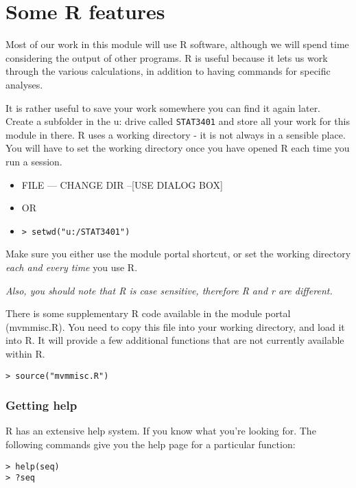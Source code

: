 \chapter{Some R features}

Most of our work in this module will use R software, although we will spend time considering the output of other programs.   R is useful because it lets us work through the various calculations, in addition to having commands for specific analyses.

It is rather useful to save your work somewhere you can find it again later.   Create a subfolder in the u: drive called \texttt{STAT3401} and store all your work for this module in there.   R uses a working directory - it is not always in a sensible place.   You will have to set the working directory once you have opened R each time you run a session.   

\begin{itemize}
\item[] FILE --- CHANGE DIR --[USE DIALOG BOX]
\item[] OR
\item[] \texttt{> setwd("u:/STAT3401")}
\end{itemize}

Make sure you either use the module portal shortcut, or set the working directory \emph{each and every time} you use R.

\emph{Also, you should note that R is case sensitive, therefore R and r are different.}

There is some supplementary R code available in the module portal (mvmmisc.R).   You need to copy this file into your working directory, and load it into R.   It will provide a few additional functions that are not currently available within R.

\begin{verbatim}
> source("mvmmisc.R")
\end{verbatim}


\subsection{Getting help}

R has an extensive help system.   If you know what you're looking for.   The following commands give you the help page for a particular function:

\begin{verbatim}
> help(seq)
> ?seq
\end{verbatim}



